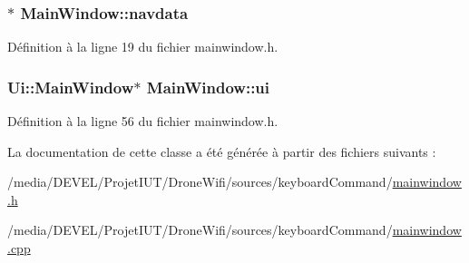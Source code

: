 \hypertarget{class_main_window_a5d39718511ba08b6c71faec434aa836d}{
\subsubsection[{navdata}]{$\ast$ Main\-Window\-::navdata}}\label{class_main_window_a5d39718511ba08b6c71faec434aa836d}


Définition à la ligne 19 du fichier mainwindow.\-h.

\hypertarget{class_main_window_a35466a70ed47252a0191168126a352a5}{
\subsubsection[{ui}]{\setlength{\rightskip}{0pt plus 5cm}Ui\-::\-Main\-Window$\ast$ Main\-Window\-::ui\hspace{0.3cm}{\ttfamily [private]}}}\label{class_main_window_a35466a70ed47252a0191168126a352a5}


Définition à la ligne 56 du fichier mainwindow.\-h.



La documentation de cette classe a été générée à partir des fichiers suivants \-:\begin{DoxyCompactItemize}
\item 
/media/\-D\-E\-V\-E\-L/\-Projet\-I\-U\-T/\-Drone\-Wifi/sources/keyboard\-Command/\hyperlink{mainwindow_8h}{mainwindow.\-h}\item 
/media/\-D\-E\-V\-E\-L/\-Projet\-I\-U\-T/\-Drone\-Wifi/sources/keyboard\-Command/\hyperlink{mainwindow_8cpp}{mainwindow.\-cpp}\end{DoxyCompactItemize}
